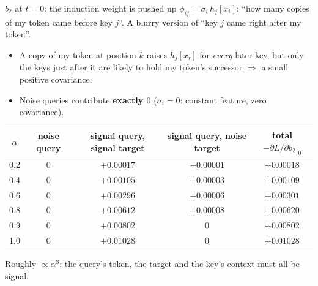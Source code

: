 \begin{frame}{$b_2$ at $t=0$: the induction weight is pushed up}
\small
$\phi_{ij}=\sigma_i\,h_j[x_i]$: ``how many copies of my token came before key $j$''. A blurry version of
``key $j$ came right after my token''.
\begin{itemize}
\item A copy of my token at position $k$ raises $h_j[x_i]$ for \emph{every} later key, but only the keys just after it are
likely to hold my token's successor $\Rightarrow$ a small positive covariance.
\item Noise queries contribute \textbf{exactly $0$} ($\sigma_i=0$: constant feature, zero covariance).
\end{itemize}
\vspace{-0.2em}
\begin{center}\footnotesize
\begin{tabular}{ccccc}\toprule
$\alpha$ & noise query & signal query, signal target & signal query, noise target & total $-\partial L/\partial b_2|_0$\\\midrule
0.2 & $0$ & $+0.00017$ & $+0.00001$ & $+0.00018$\\
0.4 & $0$ & $+0.00105$ & $+0.00003$ & $+0.00109$\\
0.6 & $0$ & $+0.00296$ & $+0.00006$ & $+0.00301$\\
0.8 & $0$ & $+0.00612$ & $+0.00008$ & $+0.00620$\\
0.9 & $0$ & $+0.00802$ & $0$ & $+0.00802$\\
1.0 & $0$ & $+0.01028$ & $0$ & $+0.01028$\\\bottomrule
\end{tabular}
\end{center}
Roughly $\propto\alpha^3$: the query's token, the target and the key's context must all be signal.
\end{frame}

